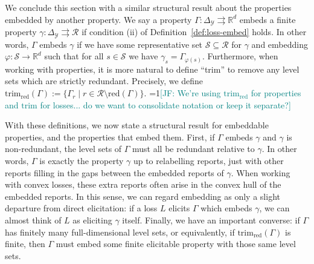 \documentclass[11pt]{article}
\newcommand{\Comments}{1}
\newcommand{\mynote}[2]{\ifnum\Comments=1\textcolor{#1}{#2}\fi}
\newcommand{\jessie}[1]{\mynote{teal}{[JF: #1]}}
\newcommand{\reals}{\mathbb{R}}
\newcommand{\simplex}{\Delta_\Y}
\newcommand{\R}{\mathcal{R}}
\newcommand{\Sc}{\mathcal{S}}
\newcommand{\Y}{\mathcal{Y}}
\newcommand{\toto}{\rightrightarrows}
\newcommand{\trim}{\mathrm{trim}}
\newcommand{\red}{\mathrm{red}}
\newcommand{\trimred}{\mathrm{trim}_\red}
\begin{document}
We conclude this section with a similar structural result about the properties embedded by another property.
We say a property $\Gamma:\simplex\toto\reals^d$ embeds a finite property $\gamma:\simplex\toto\R$ if condition (ii) of Definition~\ref{def:loss-embed} holds.
In other words, $\Gamma$ embeds $\gamma$ if we have some representative set $\Sc\subseteq\R$ for $\gamma$ and embedding $\varphi:\Sc\to\reals^d$ such that for all $s\in\Sc$ we have $\gamma_s = \Gamma_{\varphi(s)}$.
Furthermore, when working with properties, it is more natural to define ``trim'' to remove any level sets which are strictly redundant.
Precisely, we define $\trimred(\Gamma) := \{\Gamma_r \mid r \in \R\setminus\red(\Gamma)\}$.
\jessie{We're using $\trimred$ for properties and $\trim$ for losses... do we want to consolidate notation or keep it separate?}

With these definitions, we now state a structural result for embeddable properties, and the properties that embed them.
First, if $\Gamma$ embeds $\gamma$ and $\gamma$ is non-redundant, the level sets of $\Gamma$ must all be redundant relative to $\gamma$.
In other words, $\Gamma$ is exactly the property $\gamma$ up to relabelling reports, just with other reports filling in the gaps between the embedded reports of $\gamma$.
When working with convex losses, these extra reports often arise in the convex hull of the embedded reports.
In this sense, we can regard embedding as only a slight departure from direct elicitation: if a loss $L$ elicits $\Gamma$ which embeds $\gamma$, we can almost think of $L$ as eliciting $\gamma$ itself.
Finally, we have an important converse: if $\Gamma$ has finitely many full-dimensional level sets, or equivalently, if $\trimred(\Gamma)$ is finite, then $\Gamma$ must embed some finite elicitable property with those same level sets.
\end{document}
